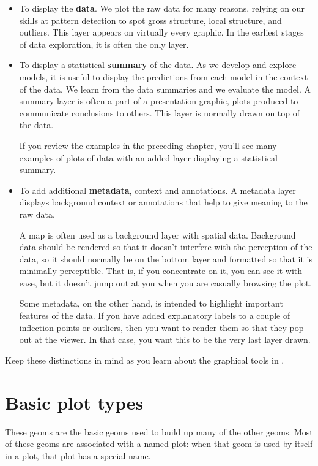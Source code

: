 \begin{itemize}
  \item To display the {\bf data}.  We plot the raw data for many reasons, relying on our skills at pattern detection to spot gross structure, local structure, and outliers.  This layer appears on virtually every graphic.  In the earliest stages of data exploration, it is often the only layer.

  \item To display a statistical {\bf summary} of the data. As we develop and explore models, it is useful to display the predictions from each model in the context of the data. We learn from the data summaries and we evaluate the model. A summary layer is often a part of a presentation graphic, plots produced to communicate conclusions to others. This layer is normally drawn on top of the data.

  If you review the examples in the preceding chapter, you'll see many examples of plots of data with an added layer displaying a statistical summary.

  \item To add additional {\bf metadata}, context and annotations. A metadata layer displays background context or annotations that help to give meaning to the raw data. 
  
  A map is often used as a background layer with spatial data. Background data should be rendered so that it doesn't interfere with the perception of the data, so it should normally be on the bottom layer and formatted so that it is minimally perceptible. That is, if you concentrate on it, you can see it with ease, but it doesn't jump out at you when you are casually browsing the plot.

  Some metadata, on the other hand, is intended to highlight important features of the data. If you have added explanatory labels to a couple of inflection points or outliers, then you want to render them so that they pop out at the viewer. In that case, you want this to be the very last layer drawn.

\end{itemize}

Keep these distinctions in mind as you learn about the graphical tools in \ggplot.  


\section{Basic plot types}\label{sec:basics}

These geoms are the basic geoms used to build up many of the other geoms.  Most of these geoms are associated with a named plot: when that geom is used by itself in a plot, that plot has a special name.

